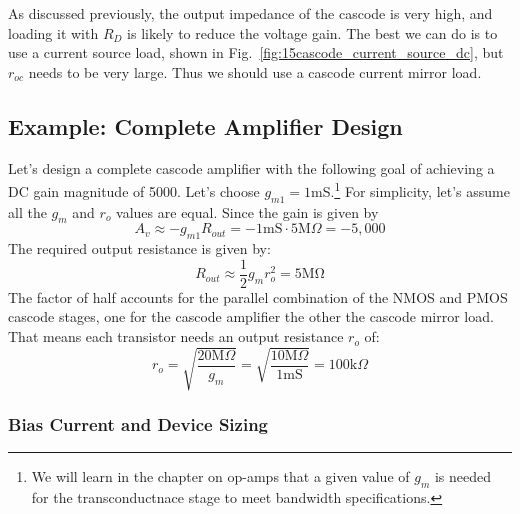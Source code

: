 As discussed previously, the output impedance of the cascode is very high, and loading it with $R_D$ is likely to reduce the voltage gain.  The best we can do is to use a current source load, shown in Fig.~\ref{fig:15cascode_current_source_dc}, but $r_{oc}$ needs to be very large. Thus we should use a cascode current mirror load.
\subsection{Example:  Complete Amplifier Design}
Let's design a complete cascode amplifier with the following goal of achieving a DC gain magnitude of 5000.   Let's choose $g_{m1} = 1$mS.\footnote{We will learn in the chapter on op-amps that a given value of $g_m$ is needed for the transconductnace stage to meet bandwidth specifications.} For simplicity, let's assume all the $g_m$ and $r_o$ values are equal.  Since the gain is given by
\begin{equation} 
	{A_v} \approx  - {g_{m1}}{R_{out}} =  - 1\mathrm{mS} \cdot 5\mathrm{M}\Omega  =  - 5,000 
\end{equation}
The required output resistance is given by:
\begin{equation} 
	{R_{out}} \approx \frac{1}{2}{g_m}r_o^2 = 5\mathrm{M\Omega} 
\end{equation}
The factor of half accounts for the parallel combination of the NMOS and PMOS cascode stages, one for the cascode amplifier the other the cascode mirror load.  That means each transistor needs an output resistance $r_o$ of:
\begin{equation} 
	{r_o} = \sqrt {\frac{{20\mathrm{M}\Omega }}{{{g_m}}}}  = \sqrt {\frac{{10\mathrm{M}\Omega }}
								{{1\mathrm{mS}}}}  = 100\mathrm{k}\Omega 
\end{equation}
\subsubsection{Bias Current and Device Sizing}

